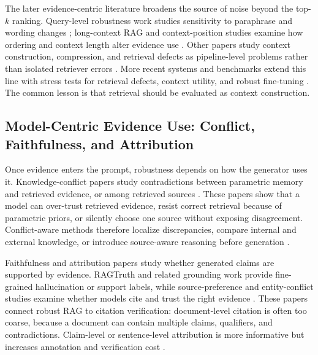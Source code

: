 The later evidence-centric literature broadens the source of noise beyond the top-$k$ ranking. Query-level robustness work studies sensitivity to paraphrase and wording changes \citep{queryRobustness2025}; long-context RAG and context-position studies examine how ordering and context length alter evidence use \citep{rrag140,rrag143,rrag154,rrag166,rrag168,rrag170}. Other papers study context construction, compression, and retrieval defects as pipeline-level problems rather than isolated retriever errors \citep{rrag174,rrag179,rrag180,rrag181,rrag182,rrag183,rrag184}. More recent systems and benchmarks extend this line with stress tests for retrieval defects, context utility, and robust fine-tuning \citep{rrag200,rrag201,rrag206,rrag210,rrag212,rrag215,rrag218,rrag219,rrag224,rrag225,rrag226}. The common lesson is that retrieval should be evaluated as context construction.

\subsection{Model-Centric Evidence Use: Conflict, Faithfulness, and Attribution}

Once evidence enters the prompt, robustness depends on how the generator uses it. Knowledge-conflict papers study contradictions between parametric memory and retrieved evidence, or among retrieved sources \citep{tugOfWar2024,faithfulRAG2025,astuteRAG2025,rrag046}. These papers show that a model can over-trust retrieved evidence, resist correct retrieval because of parametric priors, or silently choose one source without exposing disagreement. Conflict-aware methods therefore localize discrepancies, compare internal and external knowledge, or introduce source-aware reasoning before generation \citep{rrag008,rrag013,rrag017,rrag024,rrag029,rrag031,rrag036,rrag038}.

Faithfulness and attribution papers study whether generated claims are supported by evidence. RAGTruth and related grounding work provide fine-grained hallucination or support labels, while source-preference and entity-conflict studies examine whether models cite and trust the right evidence \citep{ragTruth2024,rrag110,rrag112,rrag115,rrag132}. These papers connect robust RAG to citation verification: document-level citation is often too coarse, because a document can contain multiple claims, qualifiers, and contradictions. Claim-level or sentence-level attribution is more informative but increases annotation and verification cost \citep{rrag076,rrag077,rrag082,rrag086,rrag089,rrag092,rrag100}.

